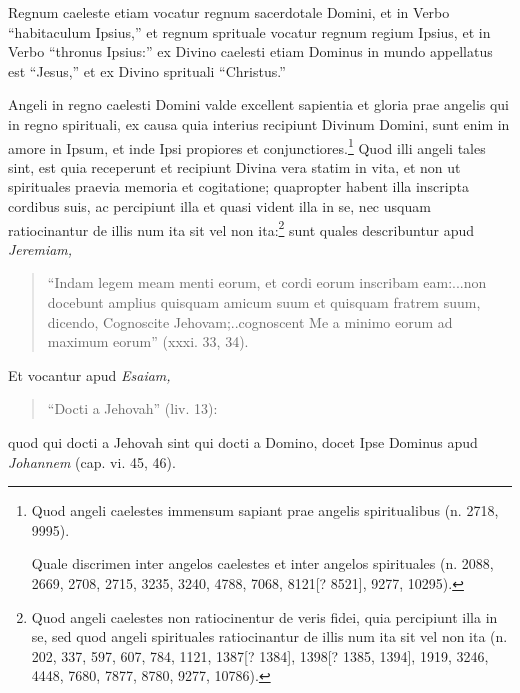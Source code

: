 \begin{topic}{24}
    Regnum caeleste etiam vocatur regnum sacerdotale Domini, et in Verbo ``habitaculum Ipsius,'' et regnum sprituale
    vocatur regnum regium Ipsius, et in Verbo ``thronus Ipsius:'' ex Divino caelesti etiam Dominus in mundo appellatus
    est ``Jesus,'' et ex Divino sprituali ``Christus.''
\end{topic}

\begin{topic}{25}
    Angeli in regno caelesti Domini valde excellent sapientia et gloria prae angelis qui in regno spirituali, ex causa
    quia interius recipiunt Divinum Domini, sunt enim in amore in Ipsum, et inde Ipsi propiores et
    conjunctiores.\footnote{Quod angeli caelestes immensum sapiant prae angelis spiritualibus (n. 2718, 9995).

    Quale discrimen inter angelos caelestes et inter angelos spirituales (n. 2088, 2669, 2708, 2715, 3235, 3240, 4788,
    7068, 8121[? 8521], 9277, 10295).}
    Quod illi angeli tales sint, est quia receperunt et recipiunt Divina vera statim in vita, et non ut spirituales
    praevia memoria et cogitatione; quapropter habent illa inscripta cordibus suis, ac percipiunt illa et quasi vident
    illa in se, nec usquam ratiocinantur de illis num ita sit vel non ita:\footnote{Quod angeli caelestes non
    ratiocinentur de veris fidei, quia percipiunt illa in se, sed quod angeli spirituales ratiocinantur de illis num ita
    sit vel non ita (n. 202, 337, 597, 607, 784, 1121, 1387[? 1384], 1398[? 1385, 1394], 1919, 3246, 4448, 7680, 7877,
    8780, 9277, 10786).} sunt quales describuntur apud \emph{Jeremiam,}
    \begin{quote}
        ``Indam legem meam menti eorum, et cordi eorum inscribam eam:...non docebunt amplius quisquam amicum suum et
        quisquam fratrem suum, dicendo, Cognoscite Jehovam;..cognoscent Me a minimo eorum ad maximum eorum'' (xxxi. 33,
        34).
    \end{quote}
    Et vocantur apud \emph{Esaiam,}
    \begin{quote}
        ``Docti a Jehovah'' (liv. 13):
    \end{quote}
    quod qui docti a Jehovah sint qui docti a Domino, docet Ipse Dominus apud \emph{Johannem} (cap. vi. 45, 46).
\end{topic}

